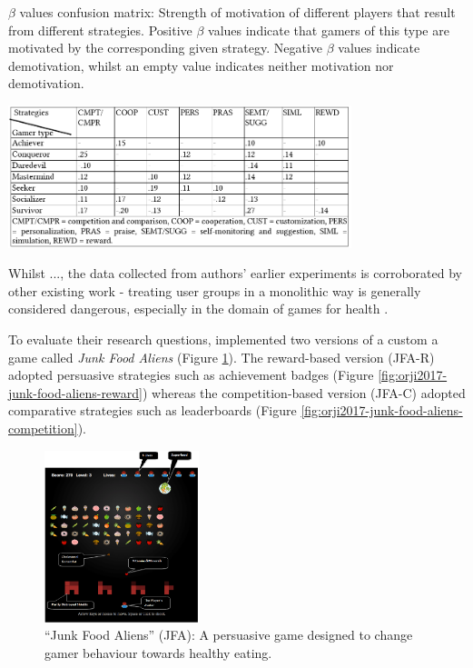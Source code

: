 \documentclass[11pt]{article}
\begin{document}
\begin{table}[H]
\centering
\caption{$\beta$ values confusion matrix: Strength of motivation of different players that result from different strategies. Positive $\beta$ values indicate that gamers of this type are motivated by the corresponding given strategy. Negative $\beta$ values indicate demotivation, whilst an empty value indicates neither motivation nor demotivation.
}\label{tbl:orji2017-beta-sem}
\includegraphics[width=0.75\textwidth]{img/orji2017-beta-sem.png} 
\end{table}

Whilst 	..., the data collected from authors' earlier experiments is corroborated by other existing work - treating user groups in a monolithic way is generally considered dangerous, especially in the domain of games for health \citep{berkovsky2010}. 

To evaluate their research questions, \citeauthor{orji2017} implemented two versions of a custom a game called \textit{Junk Food Aliens} (Figure \ref{fig:orji2017-junk-food-aliens}). The reward-based version (JFA-R) adopted persuasive strategies such as achievement badges (Figure \ref{fig:orji2017-junk-food-aliens-reward}) whereas the competition-based version (JFA-C) adopted comparative strategies such as leaderboards (Figure \ref{fig:orji2017-junk-food-aliens-competition}).

\begin{figure}[H]
\centering
\includegraphics[width=0.4\textwidth]{img/orji2017-junk-food-aliens.png} 
\caption{``Junk Food Aliens'' (JFA): A persuasive game designed to change gamer behaviour towards healthy eating.}\label{fig:orji2017-junk-food-aliens}
\end{figure}
\end{document}
